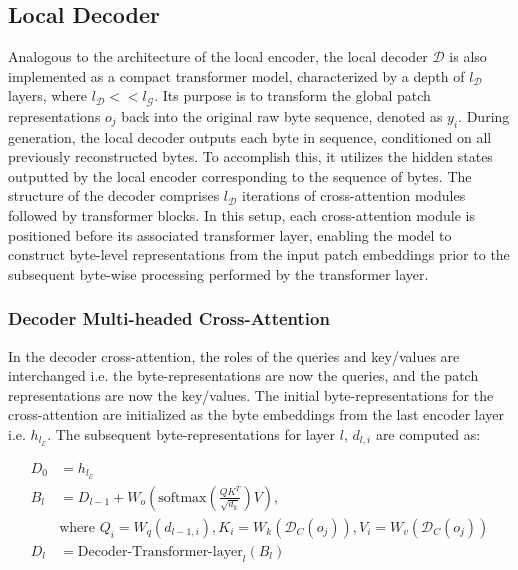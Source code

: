 \subsection{Local Decoder} 

Analogous to the architecture of the local encoder, the local decoder $\mathcal{D}$ is also implemented as a compact transformer model, characterized by a depth of $l_{\mathcal{D}}$ layers, where $l_{\mathcal{D}} << l_{\mathcal{G}}$. Its purpose is to transform the global patch representations $o_j$ back into the original raw byte sequence, denoted as $y_i$. During generation, the local decoder outputs each byte in sequence, conditioned on all previously reconstructed bytes. To accomplish this, it utilizes the hidden states outputted by the local encoder corresponding to the sequence of bytes. The structure of the decoder comprises $l_{\mathcal{D}}$ iterations of cross-attention modules followed by transformer blocks. In this setup, each cross-attention module is positioned before its associated transformer layer, enabling the model to construct byte-level representations from the input patch embeddings prior to the subsequent byte-wise processing performed by the transformer layer.

\subsubsection{Decoder Multi-headed Cross-Attention} 

In the decoder cross-attention, the roles of the queries and key/values are interchanged i.e. the byte-representations are now the queries, and the patch representations are now the key/values. The initial byte-representations for the cross-attention are initialized as the byte embeddings from the last encoder layer i.e. $h_{l_{\mathcal{E}}}$. The subsequent byte-representations for layer $l$, $d_{l,i}$ are computed as:

\begin{align}
D_0 &= h_{l_{\mathcal{E}}} \\
B_l &= D_{l-1} + W_o\left(\text{softmax}\left(\frac{QK^T}{\sqrt{d_k}}\right)V\right), \\
  &\text{where } Q_i = W_q(d_{l-1,i}), K_i = W_k(\mathcal{D}_C(o_j)), V_i = W_v(\mathcal{D}_C(o_j)) \\
  D_l &= \text{Decoder-Transformer-layer}_l(B_l)
\end{align}

